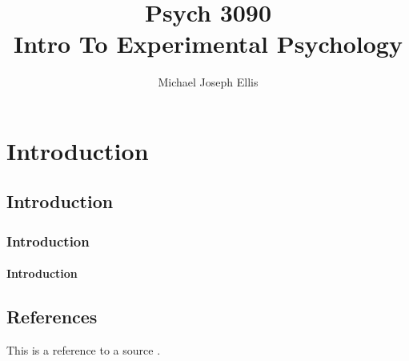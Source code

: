\documentclass[11pt]{report}
\title{\Huge{Psych 3090}\\Intro To Experimental Psychology}
\author{\huge{Michael Joseph Ellis}}
\date{}
\begin{document}
\maketitle
\newpage
\tableofcontents
\pagebreak

\chapter{Introduction}

\section{Introduction}

\subsection{Introduction}

\subsubsection{Introduction}

\section{References}
This is a reference to a source \cite{example}.



\end{document}
